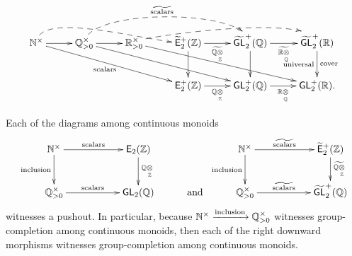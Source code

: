 \[
\xymatrix@C=1em{
\NN^\times
\ar[rr]
\ar[drrrrrr]_-{\rm scalars}
\ar@{-->}@(u,-)[rrrrrr]^-{~}
&&
\QQ_{>0}^{\times}
\ar[rr]
\ar[drrrrrr]
\ar@{-->}@(u,u)[rrrrrr]^-{\rm \w{scalars}}
&&
\RR_{>0}^{\times}
\ar[drrrrrr]
\ar@{-->}@(-,u)[rrrrrr]^-{~}
&&
\Ebraid
\ar[d]
\ar[rr]_-{\w{\QQ\underset{\ZZ}\ot}}
&&
\w{\GL}_2^+(\QQ)
\ar[d]
\ar[rr]_-{\w{\RR\underset{\QQ}\ot}}
&&
\w{\GL}_2^+(\RR)
\ar[d]^-{\rm cover}_-{\rm universal}
\\
&&&
&&&
\EpZ
\ar[rr]_-{\QQ\underset{\ZZ}\ot}
&&
\GL_2^+(\QQ)
\ar[rr]_-{\RR\underset{\QQ}\ot}
&&
\GL_2^+(\RR)
.
}
\]




\begin{prop}
\label{t59}
Each of the diagrams among continuous monoids
\[
\xymatrix{
\NN^\times
\ar[rr]^-{\rm scalars}
\ar[d]_-{\rm inclusion}
&&
\EZ
\ar[d]^-{\QQ\underset{\ZZ}\ot}
&&
\NN^\times
\ar[rr]^-{\rm \w{scalars}}
\ar[d]_-{\rm inclusion}
&&
\Ebraid
\ar[d]^-{\w{\QQ\underset{\ZZ}\ot}}
\\
\QQ_{>0}^{\times}
\ar[rr]^-{\rm scalars}
&&
\GL_2(\QQ)
&
\text{ and }
&
\QQ_{>0}^{\times}
\ar[rr]^-{\rm \w{scalars}}
&&
\w{\GL}_2^+(\QQ)
}
\]
witnesses a pushout.
In particular, because $\mathbb N^\times \xrightarrow{\rm inclusion}\mathbb Q^\times_{>0}$ witnesses group-completion among continuous monoids, then each of the right downward morphisms witnesses group-completion among continuous monoids.  



\end{prop}


